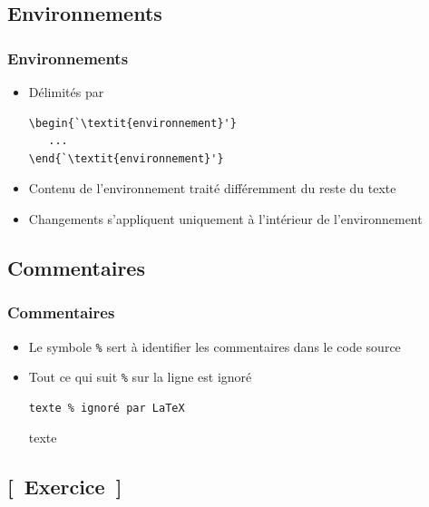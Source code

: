 \subsection{Environnements}

\begin{frame}[fragile=singleslide]
  \frametitle{Environnements}
  \begin{itemize}
  \item Délimités par
\begin{lstlisting}
\begin{`\textit{environnement}'}
   ...
\end{`\textit{environnement}'}
    \end{lstlisting}
  \item Contenu de l'environnement traité différemment du reste du texte
  \item Changements s'appliquent uniquement à l'intérieur de
    l'environnement
  \end{itemize}
\end{frame}

\subsection{Commentaires}

\begin{frame}[fragile=singleslide]
  \frametitle{Commentaires}
  \begin{itemize}
  \item Le symbole \verb=%= sert à identifier les commentaires dans
    le code source
  \item Tout ce qui suit \verb=%= sur la ligne est ignoré
    \begin{demo}
      \begin{texample}
\begin{lstlisting}
texte % ignoré par LaTeX
\end{lstlisting}
        \producing
        texte %
      \end{texample}
    \end{demo}
  \end{itemize}
\end{frame}

\subsection{[~Exercice~]}

